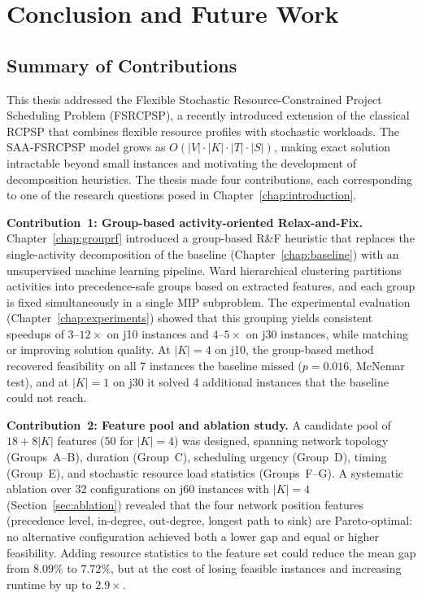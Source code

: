 \chapter{Conclusion and Future Work}
\label{chap:conclusion}

\section{Summary of Contributions}
\label{sec:conclusion_summary}
This thesis addressed the Flexible Stochastic
Resource-Constrained Project Scheduling Problem (FSRCPSP),
a recently introduced extension of the classical RCPSP that
combines flexible resource profiles with stochastic workloads.
The SAA-FSRCPSP model grows as
$O(|V| \cdot |K| \cdot |T| \cdot |S|)$, making exact solution
intractable beyond small instances and motivating the
development of decomposition heuristics. The thesis made four
contributions, each corresponding to one of the research
questions posed in Chapter~\ref{chap:introduction}.

\textbf{Contribution~1: Group-based activity-oriented
Relax-and-Fix.}
Chapter~\ref{chap:grouprf} introduced a group-based R\&F
heuristic that replaces the single-activity decomposition of
the baseline (Chapter~\ref{chap:baseline}) with an unsupervised
machine learning pipeline. Ward hierarchical clustering
partitions activities into precedence-safe groups based on
extracted features, and each group is fixed simultaneously in a
single MIP subproblem. The experimental evaluation
(Chapter~\ref{chap:experiments}) showed that this grouping
yields consistent speedups of $3$--$12\times$ on j10 instances
and $4$--$5\times$ on j30 instances, while matching or improving
solution quality. At $|K|=4$ on j10, the group-based method
recovered feasibility on all 7 instances the baseline missed
($p = 0.016$, McNemar test), and at $|K|=1$ on j30 it solved
4 additional instances that the baseline could not reach.

\textbf{Contribution~2: Feature pool and ablation study.}
A candidate pool of $18 + 8|K|$ features ($50$ for $|K|=4$)
was designed, spanning network topology (Groups~A--B), duration
(Group~C), scheduling urgency (Group~D), timing (Group~E), and
stochastic resource load statistics (Groups~F--G). A systematic
ablation over 32 configurations on j60 instances with $|K|=4$
(Section~\ref{sec:ablation}) revealed that the four network
position features (precedence level, in-degree, out-degree,
longest path to sink) are Pareto-optimal: no alternative
configuration achieved both a lower gap and equal or higher
feasibility. Adding resource statistics to the feature set
could reduce the mean gap from $8.09\%$ to $7.72\%$, but at
the cost of losing feasible instances and increasing runtime
by up to $2.9\times$.


